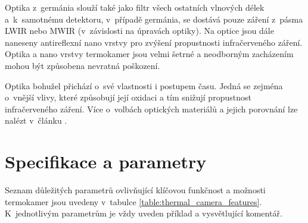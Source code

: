     Optika z~germánia slouží také jako filtr všech ostatních vlnových délek a~k~samotnému detektoru, v~případě germánia, se dostává pouze záření z~pásma LWIR nebo MWIR (v~závislosti na úpravách optiky). Na optice jsou dále naneseny antireflexní nano vrstvy pro zvýšení propustnosti infračerveného záření. Optika a nano vrstvy termokamer jsou velmi šetrné a neodborným zacházením mohou být způsobena nevratná poškození. 
     
     Optika bohužel přichází o~své vlastnosti i postupem času. Jedná se zejména o~vnější vlivy, které způsobují její oxidaci a tím snižují propustnost infračerveného záření. Více o~volbách optických materiálů a jejich porovnání lze nalézt v~článku \cite{vandervlugtchoosing}.
     
\section{Specifikace a parametry}\label{sec:thermal_camera_features}
Seznam důležitých parametrů ovlivňující klíčovou funkčnost a možnosti termokamer jsou uvedeny v~tabulce \ref{table:thermal_camera_features}. K~jednotlivým parametrům je vždy uveden příklad a vysvětlující komentář.
    
